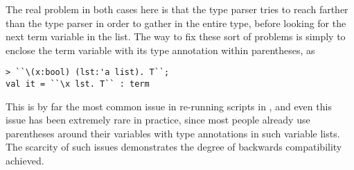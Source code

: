 The real problem in both cases here is that the \HOLW{} type parser tries to
reach farther than the \HOL{} type parser in order to gather in the entire type,
before looking for the next term variable in the list. The way to fix these
sort of problems is simply to enclose the term variable with its type
annotation within parentheses, as
\begin{session}
\begin{verbatim}
> ``\(x:bool) (lst:'a list). T``;
val it = ``\x lst. T`` : term
\end{verbatim}
\end{session}

This is by far the most common issue in re-running \HOL{} scripts in
\HOLW{}, and even this issue has been extremely rare in practice, since
most people already use parentheses around their variables
with type annotations
in such variable lists.
The scarcity of such issues demonstrates the degree of
backwards compatibility achieved.
